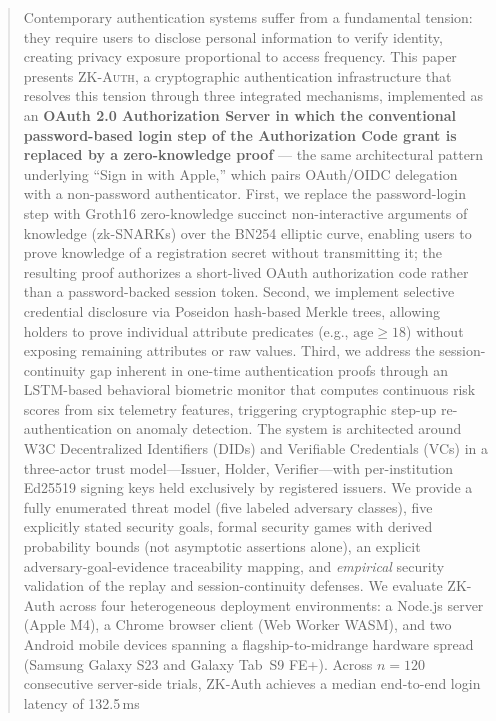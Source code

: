 \documentclass[journal,twoside,10pt]{IEEEtran}
\begin{document}
\begin{abstract}
Contemporary authentication systems suffer from a fundamental tension: they
require users to disclose personal information to verify identity, creating
privacy exposure proportional to access frequency. This paper presents
\textsc{ZK-Auth}, a cryptographic authentication infrastructure that resolves
this tension through three integrated mechanisms, implemented as an
\textbf{OAuth 2.0 Authorization Server in which the conventional
password-based login step of the Authorization Code grant is replaced by a
zero-knowledge proof} --- the same architectural pattern underlying
``Sign in with Apple,'' which pairs OAuth/OIDC delegation with a
non-password authenticator. First, we replace the password-login step with
Groth16 zero-knowledge succinct non-interactive arguments of knowledge
(zk-SNARKs) over the BN254 elliptic curve, enabling users to prove knowledge
of a registration secret without transmitting it; the resulting proof
authorizes a short-lived OAuth authorization code rather than a
password-backed session token. Second, we implement selective credential
disclosure via Poseidon hash-based Merkle trees, allowing holders to prove
individual attribute predicates (e.g., $\text{age} \geq 18$) without
exposing remaining attributes or raw values. Third, we address the
session-continuity gap inherent in one-time authentication proofs through an
LSTM-based behavioral biometric monitor that computes continuous risk scores
from six telemetry features, triggering cryptographic step-up
re-authentication on anomaly detection. The system is architected around W3C
Decentralized Identifiers (DIDs) and Verifiable Credentials (VCs) in a
three-actor trust model---Issuer, Holder, Verifier---with per-institution
Ed25519 signing keys held exclusively by registered issuers. We provide a
fully enumerated threat model (five labeled adversary classes), five
explicitly stated security goals, formal security games with derived
probability bounds (not asymptotic assertions alone), an explicit
adversary-goal-evidence traceability mapping, and \emph{empirical} security
validation of the replay and session-continuity defenses. We evaluate
ZK-Auth across four heterogeneous deployment environments: a Node.js server
(Apple M4), a Chrome browser client (Web Worker WASM), and two Android
mobile devices spanning a flagship-to-midrange hardware spread (Samsung
Galaxy S23 and Galaxy Tab~S9 FE+). Across $n=120$ consecutive server-side
trials, ZK-Auth achieves a median end-to-end login latency of 132.5\,ms

\end{abstract}
\end{document}
